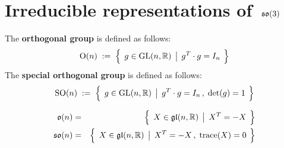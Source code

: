 

\section{Irreducible representations of \,$\mathfrak{so}(3)$}
\setcounter{theorem}{0}
\setcounter{equation}{0}


\renewcommand{\theenumi}{\roman{enumi}}
\renewcommand{\labelenumi}{\textnormal{(\theenumi)}$\;\;$}


\vskip 0.3cm
\begin{definition}
\mbox{}
\vskip 0.1cm
\noindent
The \textbf{orthogonal group} is defined as follows:
\begin{equation*}
\textnormal{O}(n)
\; := \;
	\left\{\;\,
		g \overset{{\color{white}.}}{\in} \textnormal{GL}(n,\Re)
		\;\left\vert\;\,
			g^{T} \cdot g = I_{n}
			\right.
		\;\right\}
\end{equation*}
The \textbf{special orthogonal group} is defined as follows:
\begin{equation*}
\textnormal{SO}(n)
\; := \;
	\left\{\;\,
		g \overset{{\color{white}.}}{\in} \textnormal{GL}(n,\Re)
		\;\left\vert\;\,
			g^{T} \cdot g = I_{n}\,,
			\;
			\textnormal{det}(g) = 1
			\right.
		\;\right\}
\end{equation*}
\end{definition}

\vskip 0.5cm
\begin{proposition}
\begin{eqnarray*}
\mathfrak{o}(n)
& = &
	\left\{\;\,
		X \overset{{\color{white}.}}{\in} \gl(n,\Re)
		\;\left\vert\;\,
			X^{T} = -X
			\right.
		\;\right\}
\\
\so(n)
& = &
	\left\{\;\,
		X \overset{{\color{white}.}}{\in} \gl(n,\Re)
		\;\left\vert\;\,
			X^{T} = -X\,,
			\;
			\textnormal{trace}(X) = 0
			\right.
		\;\right\}
\end{eqnarray*}
\end{proposition}


